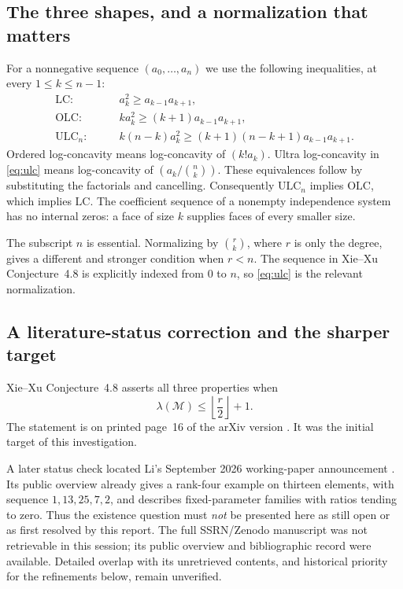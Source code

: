 \documentclass[11pt,letterpaper]{article}
\numberwithin{equation}{section}
\theoremstyle{definition}
\theoremstyle{remark}
\newcommand{\M}{\mathcal M}
\newcommand{\LC}{\mathrm{LC}}
\newcommand{\OLC}{\mathrm{OLC}}
\newcommand{\ULC}{\mathrm{ULC}}
\begin{document}
\subsection{The three shapes, and a normalization that matters}
For a nonnegative sequence $(a_0,\ldots,a_n)$ we use the following
inequalities, at every $1\le k\le n-1$:
\begin{align}
\LC:\qquad &a_k^2\ge a_{k-1}a_{k+1},\label{eq:lc}\\
\OLC:\qquad &k a_k^2\ge (k+1)a_{k-1}a_{k+1},\label{eq:olc}\\
\ULC_n:\qquad &k(n-k)a_k^2
 \ge (k+1)(n-k+1)a_{k-1}a_{k+1}.\label{eq:ulc}
\end{align}
Ordered log-concavity means log-concavity of $(k!a_k)$.
Ultra log-concavity in \eqref{eq:ulc} means log-concavity of
$(a_k/\binom nk)$. These equivalences follow by substituting the factorials
and cancelling. Consequently $\ULC_n$ implies $\OLC$, which implies $\LC$.
The coefficient sequence of a nonempty independence system has no internal
zeros: a face of size $k$ supplies faces of every smaller size.

The subscript $n$ is essential. Normalizing by $\binom rk$, where $r$ is
only the degree, gives a different and stronger condition when $r<n$.
The sequence in Xie--Xu Conjecture~4.8 is explicitly indexed from $0$ to
$n$, so \eqref{eq:ulc} is the relevant normalization.

\subsection{A literature-status correction and the sharper target}
Xie--Xu Conjecture~4.8 asserts all three properties when
\begin{equation}
\label{eq:XX}
 \lambda(\M)\le \left\lfloor\frac{r}{2}\right\rfloor+1.
\end{equation}
The statement is on printed page~16 of the arXiv version \cite{XieXu}.
It was the initial target of this investigation.

A later status check located Li's September 2026 working-paper announcement
\cite{Li}. Its public overview already gives a rank-four example on
thirteen elements, with sequence $1,13,25,7,2$, and describes fixed-parameter
families with ratios tending to zero. Thus the existence question must
\emph{not} be presented here as still open or as first resolved by this
report. The full SSRN/Zenodo manuscript was not retrievable in this session;
its public overview and bibliographic record were available. Detailed
overlap with its unretrieved contents, and historical priority for the
refinements below, remain unverified.
\end{document}
